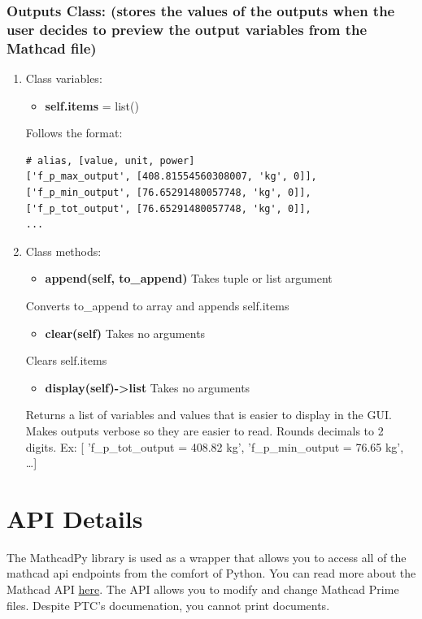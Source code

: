 \documentclass[11pt]{article}
\begin{document}
\subsubsection{Outputs Class: (stores the values of the outputs when the user decides to preview the output variables from the Mathcad file)}
\label{sec:org5c6964b}
\begin{enumerate}
\item Class variables:
\label{sec:org7016954}

\begin{itemize}
\item \textbf{self.items} = list()
\end{itemize}
Follows the format:
\begin{verbatim}
# alias, [value, unit, power]
['f_p_max_output', [408.81554560308007, 'kg', 0]],
['f_p_min_output', [76.65291480057748, 'kg', 0]],
['f_p_tot_output', [76.65291480057748, 'kg', 0]],
...
\end{verbatim}
\item Class methods:
\label{sec:org2cd14dd}
\begin{itemize}
\item \textbf{append(self, to\_append)} Takes tuple or list argument
\end{itemize}
Converts to\_append to array and appends self.items

\begin{itemize}
\item \textbf{clear(self)} Takes no arguments
\end{itemize}
Clears self.items

\begin{itemize}
\item \textbf{display(self)->list} Takes no arguments
\end{itemize}
Returns a list of variables and values that is easier to display in the GUI. Makes outputs verbose so they are easier to read. Rounds decimals to 2 digits. 
Ex: [ 'f\_p\_tot\_output = 408.82 kg', 'f\_p\_min\_output = 76.65 kg', \ldots{}]
\end{enumerate}

\section{API Details}
\label{sec:org8fa64e6}

The MathcadPy library is used as a wrapper that allows you to access all of the mathcad api endpoints from the comfort of Python. You can read more about the Mathcad API \href{https://support.ptc.com/help/mathcad/r7.0/en/index.html\#page/PTC\_Mathcad\_Help\%2Fmathcad\_and\_automation\_api.html\%23}{here}. The API allows you to modify and change Mathcad Prime files. Despite PTC's documenation, you cannot print documents.
\end{document}
